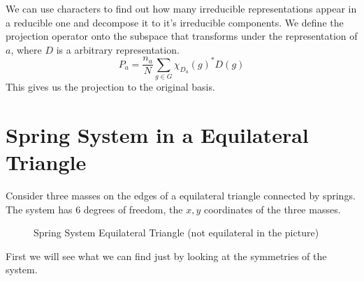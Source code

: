 \documentclass[a4paper]{article}
\theoremstyle{definition}
\theoremstyle{definition}
\theoremstyle{definition}
\theoremstyle{theorem}
\theoremstyle{theorem}
\theoremstyle{definition}
\begin{document}
We can use characters to find out how many irreducible representations appear in a reducible one and
decompose it to it's irreducible components. We define the projection operator onto the subspace that
transforms under the representation of $a$, where $D$ is a arbitrary representation.
\begin{equation}
    P_a = \frac{n_a}{N} \sum _{g\in G} \chi _{D_a}(g)^* D(g)
\end{equation}
This gives us the projection to the original basis.

\section{Spring System in a Equilateral Triangle}
Consider three masses on the edges of a equilateral triangle connected by springs.
The system has 6 degrees of freedom, the $x, y$ coordinates of the three masses.

\begin{figure}[h!]
    \centering
    \caption{Spring System Equilateral Triangle (not equilateral in the picture)\label{drawing}}
\end{figure}

First we will see what we can find just by looking at the symmetries of the system.
\end{document}

